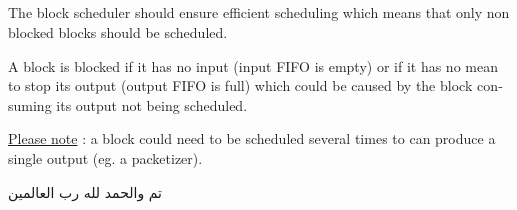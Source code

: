 \documentclass[10pt, a4paper]{article}
\begin{document}
\subsection{}
\begin{otherlanguage}{english}
The block scheduler should ensure efficient scheduling which means that only non blocked blocks should be scheduled.
\par A block is blocked if it has no input (input FIFO is empty) or if it has no mean to stop its output (output FIFO is full) which could be caused by the block consuming its output not being scheduled.
\par \underline{Please note} : a block could need to be scheduled several times to can produce a single output (eg. a packetizer).
\end{otherlanguage}
\par
تم والحمد لله رب العالمين
\end{document}
